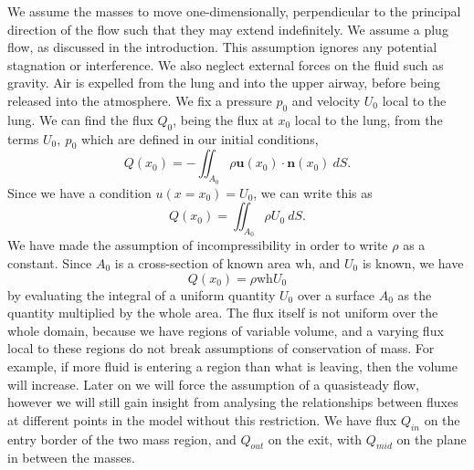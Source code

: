 We assume the masses to move one-dimensionally, perpendicular to the principal direction of the flow such that they may extend indefinitely.
We assume a plug flow, as discussed in the introduction. %
This assumption ignores any potential stagnation or interference.
We also neglect external forces on the fluid such as gravity.
Air is expelled from the lung and into the upper airway, before being released into the atmosphere.
We fix a pressure $p_0$ and velocity $U_0$ local to the lung.
We can find the flux $Q_0$, being the flux at $x_0$ local to the lung, from the terms $U_0,~p_0$ which are defined in our initial conditions,
\begin{equation}
    Q(x_0) = -\iint_{A_0} \rho \mathbf{u}(x_0)\cdot \mathbf{n}(x_0)~dS.
\end{equation}
Since we have a condition $u(x=x_0) = U_0$, we can write this as
\begin{equation}
    Q(x_0) = \iint_{A_0} \rho U_0~dS.
\end{equation}
We have made the assumption of incompressibility in order to write $\rho$ as a constant.
Since $A_0$ is a cross-section of known area $\mathrm{\mathrm{wh}}$, and $U_0$ is known, we have
\begin{equation}
    Q(x_0) = \rho \mathrm{wh} U_0
    \label{eqn:twomass_lung_flux}
\end{equation}
by evaluating the integral of a uniform quantity $U_0$ over a surface $A_0$ as the quantity multiplied by the whole area.
The flux itself is not uniform over the whole domain, because we have regions of variable volume, and a varying flux local to these regions do not break assumptions of conservation of mass.
For example, if more fluid is entering a region than what is leaving, then the volume will increase.
Later on we will force the assumption of a quasisteady flow,
however we will still gain insight from analysing the relationships between fluxes at different points in the model without this restriction.
We have flux $Q_{in}$ on the entry border of the two mass region, and $Q_{out}$ on the exit,
with $Q_{mid}$ on the plane in between the masses.


